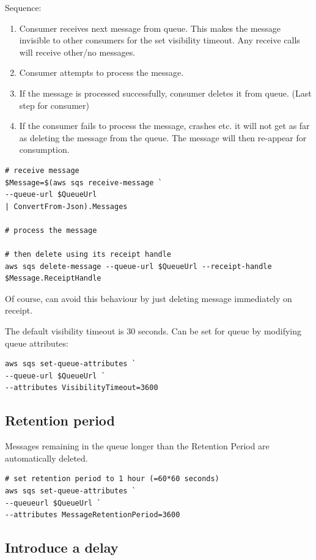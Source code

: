 \documentclass{pgnotes}
\begin{document}
Sequence: 
\begin{enumerate}
\item Consumer receives next message from queue. This makes the message invisible to other consumers for the set visibility timeout. Any receive calls will receive other/no messages.
\item Consumer attempts to process the message.
\item If the message is processed successfully, consumer deletes it from queue. (Last step for consumer)
\item If the consumer fails to process the message, crashes etc. it will not get as far as deleting the message from the queue. The message will then re-appear for consumption.
\end{enumerate}

\begin{verbatim}
# receive message
$Message=$(aws sqs receive-message `
--queue-url $QueueUrl 
| ConvertFrom-Json).Messages 

# process the message

# then delete using its receipt handle
aws sqs delete-message --queue-url $QueueUrl --receipt-handle $Message.ReceiptHandle
\end{verbatim}

Of course, can avoid this behaviour by just deleting message immediately on receipt.

The default visibility timeout is 30 seconds.
Can be set for queue by modifying queue attributes:
\begin{verbatim}
aws sqs set-queue-attributes `
--queue-url $QueueUrl `
--attributes VisibilityTimeout=3600
\end{verbatim}

\subsection{Retention period}

Messages remaining in the queue longer than the Retention Period are automatically deleted.
\begin{verbatim}
# set retention period to 1 hour (=60*60 seconds)
aws sqs set-queue-attributes `
--queueurl $QueueUrl `
--attributes MessageRetentionPeriod=3600
\end{verbatim}

\subsection{Introduce a delay}
\end{document}
